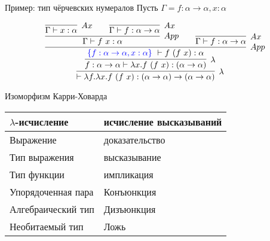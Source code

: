 \documentclass[aspectratio=169]{beamer}
\begin{document}
\begin{frame}{Пример: тип чёрчевских нумералов}
Пусть $\Gamma = f:\alpha\rightarrow\alpha, x: \alpha$

$$\infer[\lambda]{\vdash \lambda f.\lambda x.f\ (f\ x) : (\alpha\rightarrow\alpha)\rightarrow(\alpha\rightarrow\alpha)}{
  \infer[\lambda]{f: \alpha\rightarrow\alpha \vdash \lambda x.f\ (f\ x) : (\alpha\rightarrow\alpha)}{
    \infer[App]{{\color{blue}\{ f:\alpha\rightarrow\alpha, x: \alpha\}\ } \vdash f\ (f\ x): \alpha}{
      \infer[App]{\Gamma \vdash f\ x: \alpha}{
        \infer[Ax]{\Gamma \vdash x: \alpha}{}\quad\quad\infer[Ax]{\Gamma \vdash f: \alpha\rightarrow\alpha}{}
      }\quad\quad
      \infer[Ax]{\Gamma \vdash f: \alpha\rightarrow\alpha}{}
    }
  }
}$$
\end{frame}


\begin{frame}{Изоморфизм Карри-Ховарда}

\begin{tabular}{ll}
$\lambda$-исчисление & исчисление высказываний\\\hline
Выражение & доказательство\\
Тип выражения & высказывание\\
Тип функции & импликация\\
Упорядоченная пара & Конъюнкция\\
Алгебраический тип & Дизъюнкция\\
Необитаемый тип & Ложь
\end{tabular}

\end{frame}
\end{document}

